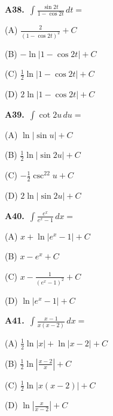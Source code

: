 \documentclass[11pt]{article}
\begin{document}
\bigskip\noindent\textbf{A38.}\ $\displaystyle\int \frac{\sin2t}{1-\cos2t}\,dt=$
\begin{list}{}{\setlength{\leftmargin}{3em}\setlength{\labelwidth}{2.5em}\setlength{\itemsep}{0pt}\setlength{\topsep}{2pt}}
\item[(A)] $\frac2{(1-\cos2t)^2}+C$
\item[(B)] $-\ln\lvert1-\cos2t\rvert+C$
\item[(C)] $\frac12\ln\lvert1-\cos2t\rvert+C$
\item[(D)] $2\ln\lvert1-\cos2t\rvert+C$
\end{list}

\bigskip\noindent\textbf{A39.}\ $\displaystyle\int \cot2u\,du=$
\begin{list}{}{\setlength{\leftmargin}{3em}\setlength{\labelwidth}{2.5em}\setlength{\itemsep}{0pt}\setlength{\topsep}{2pt}}
\item[(A)] $\ln\lvert\sin u\rvert+C$
\item[(B)] $\frac12\ln\lvert\sin2u\rvert+C$
\item[(C)] $-\frac12\csc^22u+C$
\item[(D)] $2\ln\lvert\sin2u\rvert+C$
\end{list}

\bigskip\noindent\textbf{A40.}\ $\displaystyle\int \frac{e^x}{e^x-1}\,dx=$
\begin{list}{}{\setlength{\leftmargin}{3em}\setlength{\labelwidth}{2.5em}\setlength{\itemsep}{0pt}\setlength{\topsep}{2pt}}
\item[(A)] $x+\ln\lvert e^x-1\rvert+C$
\item[(B)] $x-e^x+C$
\item[(C)] $x-\frac1{(e^x-1)^2}+C$
\item[(D)] $\ln\lvert e^x-1\rvert+C$
\end{list}

\bigskip\noindent\textbf{A41.}\ $\displaystyle\int \frac{x-1}{x(x-2)}\,dx=$
\begin{list}{}{\setlength{\leftmargin}{3em}\setlength{\labelwidth}{2.5em}\setlength{\itemsep}{0pt}\setlength{\topsep}{2pt}}
\item[(A)] $\frac12\ln\lvert x\rvert+\ln\lvert x-2\rvert+C$
\item[(B)] $\frac12\ln\left\lvert\frac{x-2}x\right\rvert+C$
\item[(C)] $\frac12\ln\lvert x(x-2)\rvert+C$
\item[(D)] $\ln\left\lvert\frac x{x-2}\right\rvert+C$
\end{list}
\end{document}
